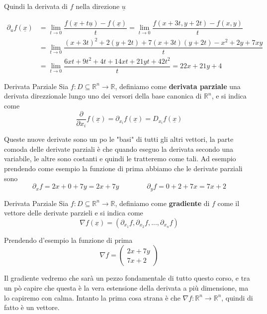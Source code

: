 \documentclass{rapport}
\begin{document}
Quindi la derivata di $f$ nella direzione $\underline{u}$

\begin{align*}  
  \partial_{u}f(\underline{x}) &= \lim_{t\to 0} \dfrac{f(\underline{x} + t\underline{u}) - f(\underline{x})}{t} = \lim_{t\to 0} \dfrac{f(x+3t, y+2t) - f(x, y)}{t} \\
  &= \lim_{t\to 0} \dfrac{(x+3t)^2 + 2(y+2t) +7(x+3t)(y+2t) -  x^2+2y +7xy }{t} \\
  &= \lim_{t\to 0} \dfrac{6xt+9t^2+4t +14xt+21yt+ 42t^2 }{t} = 22x +21y +4 
\end{align*}

\begin{definizione}{Derivata Parziale}{}
  Sia $f:D \subseteq \mathbb{R}^n \to \mathbb{R}$, definiamo come \textbf{derivata parziale} una derivata direzzionale lungo uno dei versori della base canonica di $\mathbb{R}^n$, e si indica come 
  \[
  \dfrac{\partial }{\partial x_i}f(\underline{x}) = \partial_{x_i} f(\underline{x}) = D_{x_i} f(\underline{x})
  \]
\end{definizione}

Queste nuove derivate sono un po le "basi" di tutti gli altri vettori, la parte comoda delle derivate parziali è che quando eseguo la derivata secondo una variabile, le altre sono costanti e quindi le tratteremo come tali. Ad esempio prendendo come esempio la funzione di prima abbiamo che le derivate parziali sono 
\[
 \partial_{x} f= 2x + 0 + 7y = 2x + 7y 
\qquad\qquad
 \partial_{y} f= 0 + 2 + 7x = 7x +2
\]

\begin{definizione}{Derivata Parziale}{}
  Sia $f:D \subseteq \mathbb{R}^n \to \mathbb{R}$, definiamo come \textbf{gradiente} di $f$ come il vettore delle derivate parzieli e si indica come
 \[
 \nabla f(\underline{x}) = \left(\partial_{x_1} f, \partial_{x_2} f, ..., \partial_{x_n} f \right)
 \]
\end{definizione}

Prendendo d'esempio la funzione di prima 
\[
\nabla f = \begin{pmatrix}
  2x + 7y  \\
  7x +2
\end{pmatrix}
\]

\newpage

Il gradiente vedremo che sarà un pezzo fondamentale di tutto questo corso, e tra un pò capire che questa è la vera estensione della derivata a più dimensione, ma lo capiremo con calma. Intanto la prima cosa strana è che $\nabla f: \mathbb{R}^n \to \mathbb{R}^n $, quindi di fatto è un vettore. 
\end{document}

